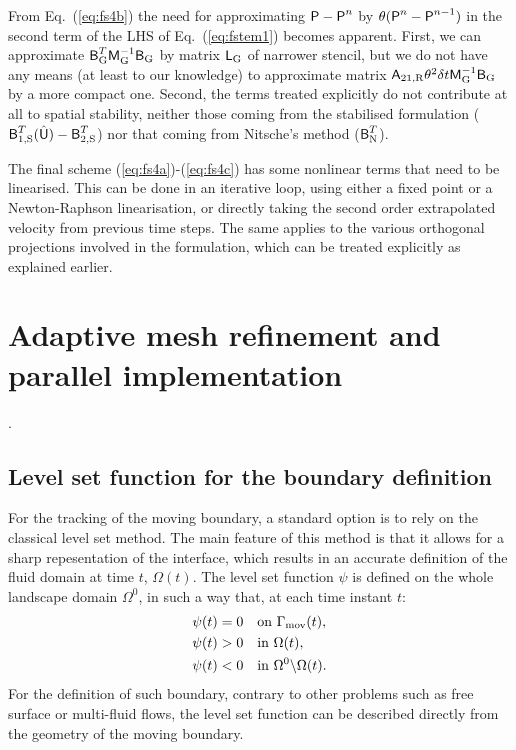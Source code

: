 \documentclass[11pt,a4paper,oneside,reqno]{amsart}
\newcommand{\Eq}[1]{(\ref{eq:#1})}
\def\dt{{\delta t}}
\def\mA{\hbox{{\sffamily A}}}
\def\mB{\hbox{{\sffamily B}}}
\def\mL{\hbox{{\sffamily L}}}
\def\mM{\hbox{{\sffamily M}}}
\def\mU{\hbox{{\sffamily U}}}
\def\mP{\hbox{{\sffamily P}}}
\begin{document}
From Eq.~\Eq{fs4b} the need for approximating $\mP - \mP^n$ by $ \theta(\mP^n - \mP^{n-1})$ in the second term of the LHS of Eq.~\Eq{fstem1} becomes apparent. First, we can approximate $\mB_{\rm G}^T \mM^{-1}_{\rm G}\mB_{\rm G} $ by matrix $\mL_{\rm G}$ of narrower stencil, but we do not have any means (at least to our knowledge) to approximate matrix $\mA_{21,{\rm R}} \theta^2 \dt  \mM^{-1}_{\rm G}  \mB_{\rm G}$ by a more compact one. Second, the terms treated explicitly do not contribute at all to spatial stability, neither those coming from the stabilised formulation ($\mB^T_{1,\rm S}(\hat{\mU}) - \mB^T_{2,\rm S}$) nor that coming from Nitsche's method ($\mB_{\rm N}^T$).

The final scheme \Eq{fs4a}-\Eq{fs4c} has some nonlinear terms that need to be linearised. This can be done in an iterative loop, using either a fixed point or a Newton-Raphson linearisation, or directly taking the second order extrapolated velocity from previous time steps. The same applies to the various orthogonal projections involved in the formulation, which can be treated explicitly as explained earlier. 

\section{Adaptive mesh refinement and parallel implementation}\label{sec:amr}.

\subsection{Level set function for the boundary definition}

For the tracking of the moving boundary, a standard option is to rely on the classical
level set method. The main feature of this method is that
it allows for a sharp repesentation of the interface, which results in an
accurate definition of the fluid domain at time $t$, $\Omega(t)$.
The level set function $\psi$ is defined on the whole landscape domain $\Omega^0$, in such a way that, at each
time instant $t$:
\begin{align*}
\psi(t) & =0\quad\text{on }\Gamma_{\rm mov}(t),\\
\psi(t) & >0\quad\text{in }\Omega(t),\\
\psi(t) & <0\quad\text{in }\Omega^{0}\backslash\Omega(t).
\end{align*}
For the definition of such boundary, contrary to other problems such
as free surface or multi-fluid flows, the level set function can be
described directly from the geometry of the moving boundary. 
\end{document}
